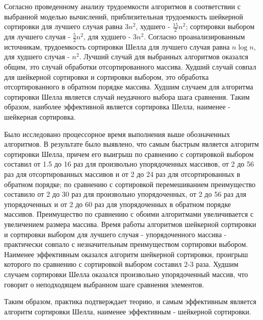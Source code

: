 \documentclass[a4paper,oneside,14pt]{extreport}
\begin{document}
Согласно проведенному анализу трудоемкости алгоритмов в соответствии с выбранной моделью вычислений, приблизительная трудоемкость шейкерной сортировки для лучшего случая равна $3n^2$, худшего - $\frac{15}{2}n^2$; сортировки выбором для лучшего случая - $\frac{5}{2}n^2$, для худшего - $3n^2$. Согласно проанализированным источникам, трудоемкость сортировки Шелла для лучшего случая равна $n \log n$, для худшего случая - $n^2$. Лучший случай для выбранных алгоритмов оказался общим, это случай обработки отсортированного массива. Худший случай совпал для шейкерной сортировки и сортировки выбором, это обработка отсортированного в обратном порядке массива. Худшим случаем для алгоритма сортировки Шелла является случай неудачного выбора шага сравнения. Таким образом, наиболее эффективной является сортировка Шелла, наименее - шейкерная сортировка.

Было исследовано процессорное время выполнения выше обозначенных алгоритмов. В результате было выявлено, что самым быстрым является алгоритм сортировки Шелла, причем его выигрыш по сравнению с сортировкой выбором составил от 1.5 до 16 раз для произвольно упорядоченных массивов, от 2 до 56 раз для отсортированных массивов и от 2 до 24 раз для отсортированных в обратном порядке; по сравнению с сортировкой перемешиванием преимущество составило от 2 до 30 раз для произвольно упорядоченных, от 2 до 56 раз для упорядоченных и от 2 до 60 раз для упорядоченных в обратном порядке массивов. Преимущество по сравнению с обоими алгоритмами увеличивается с увеличением размера массива. Время работы алгоритмов шейкерной сортировки и сортировки выбором для лучшего случая - упорядоченного массива - практически совпало с незначительным преимуществом сортировки выбором. Наименее эффективным оказался алгоритм шейкерной сортировки, проигрыш которого по сравнению с сортировкой выбором составил 2-3 раза. Худшим случаем сортировки Шелла оказался произвольно упорядоченный массив, что говорит о неподходящем выбранном шаге сравнения элементов.

Таким образом, практика подтверждает теорию, и самым эффективным является алгоритм сортировки Шелла, наименее эффективным - шейкерной сортировки.

\newpage
{}



\nocite{*}
\end{document}
